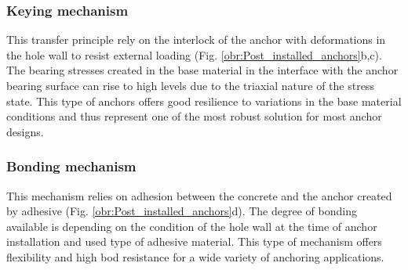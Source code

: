 \subsubsection{Keying mechanism}
This transfer principle rely on the interlock of the anchor with deformations in the hole wall to resist external loading (Fig. \ref{obr:Post_installed_anchors}b,c). The bearing stresses created in the base material in the interface with the anchor bearing surface can rise to high levels due to the triaxial nature of the stress state. This type of anchors offers good resilience to variations in the base material conditions and thus represent one of the most robust solution for most anchor designs. 

\subsubsection{Bonding mechanism}
This mechanism relies on adhesion between the concrete and the anchor created by adhesive (Fig. \ref{obr:Post_installed_anchors}d). The degree of bonding available is depending on the condition of the hole wall at the time of anchor installation and used type of adhesive material. This type of mechanism offers flexibility and high bod resistance for a wide variety of anchoring applications. 

